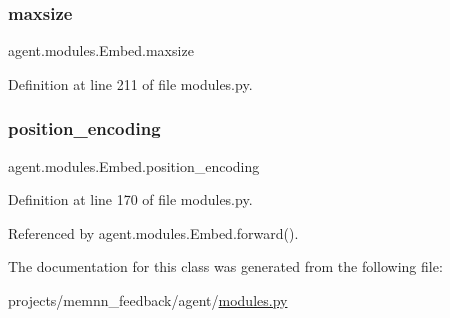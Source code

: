 \subsubsection{\texorpdfstring{maxsize}{maxsize}}
{\footnotesize\ttfamily agent.\+modules.\+Embed.\+maxsize\hspace{0.3cm}{\ttfamily [static]}}



Definition at line 211 of file modules.\+py.

\mbox{\label{classagent_1_1modules_1_1Embed_a482a481bdc736280d0af174a15f6e8ee}} 
\subsubsection{\texorpdfstring{position\+\_\+encoding}{position\_encoding}}
{\footnotesize\ttfamily agent.\+modules.\+Embed.\+position\+\_\+encoding}



Definition at line 170 of file modules.\+py.



Referenced by agent.\+modules.\+Embed.\+forward().



The documentation for this class was generated from the following file\+:\begin{DoxyCompactItemize}
\item 
projects/memnn\+\_\+feedback/agent/\hyperlink{projects_2memnn__feedback_2agent_2modules_8py}{modules.\+py}\end{DoxyCompactItemize}
